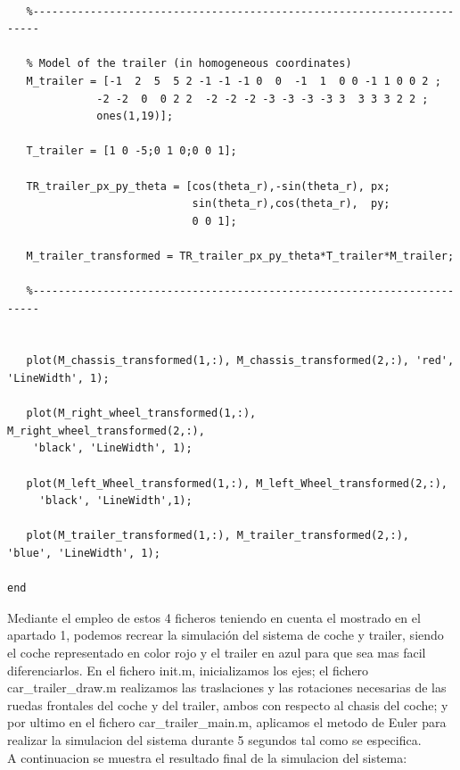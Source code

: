\documentclass{article}
\begin{document}
\bigskip

\begin{tcolorbox}
[
title={File \texttt{car\_trailer\_draw.m}}
]
\begin{scriptsize}
\begin{verbatim}

   %-----------------------------------------------------------------------
   
   % Model of the trailer (in homogeneous coordinates)     
   M_trailer = [-1  2  5  5 2 -1 -1 -1 0  0  -1  1  0 0 -1 1 0 0 2 ; 
              -2 -2  0  0 2 2  -2 -2 -2 -3 -3 -3 -3 3  3 3 3 2 2 ;
              ones(1,19)];
   
   T_trailer = [1 0 -5;0 1 0;0 0 1];

   TR_trailer_px_py_theta = [cos(theta_r),-sin(theta_r), px;
                             sin(theta_r),cos(theta_r),  py;
                             0 0 1]; 

   M_trailer_transformed = TR_trailer_px_py_theta*T_trailer*M_trailer;
   
   %-----------------------------------------------------------------------
   
 
   plot(M_chassis_transformed(1,:), M_chassis_transformed(2,:), 'red', 'LineWidth', 1);
               
   plot(M_right_wheel_transformed(1,:), M_right_wheel_transformed(2,:), 
   	'black', 'LineWidth', 1);
   	
   plot(M_left_Wheel_transformed(1,:), M_left_Wheel_transformed(2,:),
   	 'black', 'LineWidth',1);  
    
   plot(M_trailer_transformed(1,:), M_trailer_transformed(2,:), 'blue', 'LineWidth', 1);            

end

\end{verbatim}
\end{scriptsize}
\end{tcolorbox}

\bigskip

Mediante el empleo de estos 4 ficheros teniendo en cuenta el mostrado en el apartado 1, podemos recrear la simulación del sistema de coche y trailer, siendo el coche representado en color rojo y el trailer en azul para que sea mas facil diferenciarlos. En el fichero init.m, inicializamos los ejes; el fichero car\_trailer\_draw.m realizamos las traslaciones y las rotaciones necesarias de las ruedas frontales del coche y del trailer, ambos con respecto al chasis del coche; y por ultimo en el fichero car\_trailer\_main.m, aplicamos el metodo de Euler para realizar la simulacion del sistema durante 5 segundos tal como se especifica.\\
A continuacion se muestra el resultado final de la simulacion del sistema: 
\end{document}
